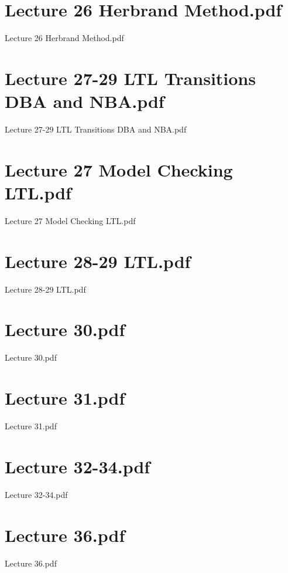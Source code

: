 \documentclass[aspectratio = 43]{beamer}
\begin{document}
\section{Lecture 26 Herbrand Method.pdf}
\begin{frame}{Lecture 26 Herbrand Method.pdf}
\end{frame}

\section{Lecture 27-29 LTL Transitions DBA and NBA.pdf}
\begin{frame}{Lecture 27-29 LTL Transitions DBA and NBA.pdf}
\end{frame}

\section{Lecture 27 Model Checking LTL.pdf}
\begin{frame}{Lecture 27 Model Checking LTL.pdf}
\end{frame}

\section{Lecture 28-29 LTL.pdf}
\begin{frame}{Lecture 28-29 LTL.pdf}
\end{frame}

\section{Lecture 30.pdf}
\begin{frame}{Lecture 30.pdf}
\end{frame}

\section{Lecture 31.pdf}
\begin{frame}{Lecture 31.pdf}
\end{frame}

\section{Lecture 32-34.pdf}
\begin{frame}{Lecture 32-34.pdf}
\end{frame}

\section{Lecture 36.pdf}
\begin{frame}{Lecture 36.pdf}
\end{frame}

\newpage
\end{document}
